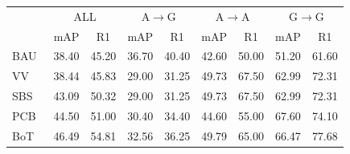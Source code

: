 \documentclass[runningheads]{llncs}
\makeatletter
\let\leaderboards@table\table
\let\leaderboards@endtable\endtable
\renewenvironment{table}[1][]{\leaderboards@table[H]}{\leaderboards@endtable}
\makeatother
\begin{document}
\begin{table}[t]
  \caption{\textbf{Performance comparison on CARGO.}
    Best results are in \textbf{bold}.}
  \label{tab:sota_cargo}
  \centering
  \begin{tabular}{lcccccccc}
    \Xhline{1.0pt}
    \multirow{2}{*}{Method}
                                       & \multicolumn{2}{c}{ALL}
                                       & \multicolumn{2}{c}{A$\rightarrow$G}
                                       & \multicolumn{2}{c}{A$\rightarrow$A}
                                       & \multicolumn{2}{c}{G$\rightarrow$G}                                                                                                                                                                                   \\
    \cmidrule(lr){2-3}\cmidrule(lr){4-5}\cmidrule(lr){6-7}\cmidrule(lr){8-9}
                                       & \multicolumn{1}{c}{mAP}             & \multicolumn{1}{c}{R1} & \multicolumn{1}{c}{mAP} & \multicolumn{1}{c}{R1} & \multicolumn{1}{c}{mAP} & \multicolumn{1}{c}{R1} & \multicolumn{1}{c}{mAP} & \multicolumn{1}{c}{R1} \\
    \Xhline{0.6pt}
    BAU~\cite{cho2024generalizable}    & 38.40                               & 45.20                  & 36.70                   & 40.40                  & 42.60                   & 50.00                  & 51.20                   & 61.60                  \\
    VV~\cite{kumar2020strong}          & 38.44                               & 45.83                  & 29.00                   & 31.25                  & 49.73                   & 67.50                  & 62.99                   & 72.31                  \\
    SBS~\cite{he2023fastreid}          & 43.09                               & 50.32                  & 29.00                   & 31.25                  & 49.73                   & 67.50                  & 62.99                   & 72.31                  \\
    PCB~\cite{sun2019learning}         & 44.50                               & 51.00                  & 30.40                   & 34.40                  & 44.60                   & 55.00                  & 67.60                   & 74.10                  \\
    BoT~\cite{luo2019bag}              & 46.49                               & 54.81                  & 32.56                   & 36.25                  & 49.79                   & 65.00                  & 66.47                   & 77.68                  \\

\end{tabular}
\end{table}
\end{document}
